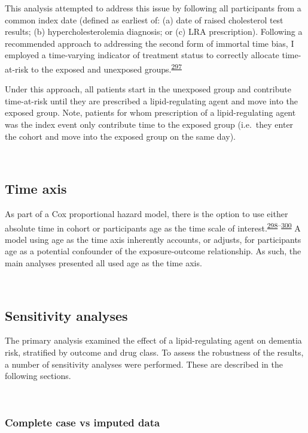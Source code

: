 \documentclass[a4paper, twoside]{templates/ociamthesis}
\begin{document}
This analysis attempted to address this issue by following all participants from a common index date (defined as earliest of: (a) date of raised cholesterol test results; (b) hypercholesterolemia diagnosis; or (c) LRA prescription). Following a recommended approach to addressing the second form of immortal time bias, I employed a time-varying indicator of treatment status to correctly allocate time-at-risk to the exposed and unexposed groups.\textsuperscript{\protect\hyperlink{ref-levesque2010}{297}}

Under this approach, all patients start in the unexposed group and contribute time-at-risk until they are prescribed a lipid-regulating agent and move into the exposed group. Note, patients for whom prescription of a lipid-regulating agent was the index event only contribute time to the exposed group (i.e.~they enter the cohort and move into the exposed group on the same day).

~

\hypertarget{cprd-time-axis}{%
\subsection{Time axis}\label{cprd-time-axis}}

As part of a Cox proportional hazard model, there is the option to use either absolute time in cohort or participants age as the time scale of interest.\textsuperscript{\protect\hyperlink{ref-lamarca1998}{298}--\protect\hyperlink{ref-pencina2007}{300}} A model using age as the time axis inherently accounts, or adjusts, for participants age as a potential confounder of the exposure-outcome relationship. As such, the main analyses presented all used age as the time axis.

~

\hypertarget{sensitivity-analyses}{%
\subsection{Sensitivity analyses}\label{sensitivity-analyses}}

The primary analysis examined the effect of a lipid-regulating agent on dementia risk, stratified by outcome and drug class. To assess the robustness of the results, a number of sensitivity analyses were performed. These are described in the following sections.

~

\hypertarget{complete-case-vs-imputed-data}{%
\subsubsection{Complete case vs imputed data}\label{complete-case-vs-imputed-data}}
\end{document}

